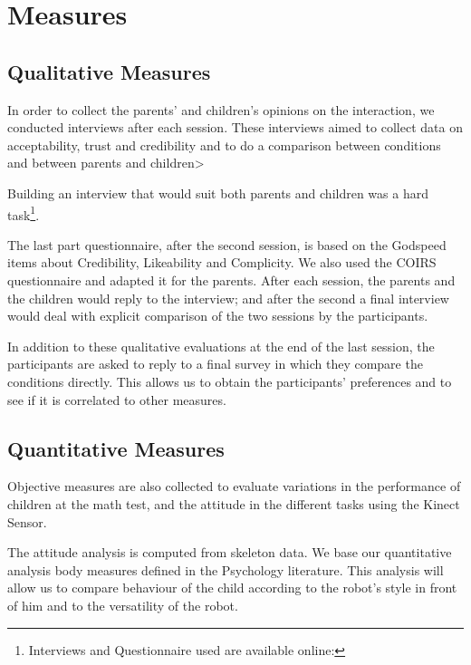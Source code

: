 \section{Measures}
\label{sec:measures}
\subsection{Qualitative Measures}
In order to collect the parents' and children's opinions on the interaction, we conducted interviews after each session.
These interviews aimed to collect data on acceptability, trust and credibility and to do a comparison between conditions and between parents and children>

Building an interview that would suit both parents and children was a hard task\footnote{Interviews and Questionnaire used are available online: }.%






The last part questionnaire, after the second session, is based on the Godspeed\cite{Bartneck2008b} items about Credibility, Likeability and Complicity.
We also used the COIRS~\cite{Robert2014} questionnaire and adapted it for the parents.
After each session, the parents and the children would reply to the interview; and after the second a final interview would deal with explicit comparison of the two sessions by the participants.


In addition to these qualitative evaluations at the end of the last session, the participants are asked to reply to a final survey in which they compare the conditions directly.
This allows us to obtain the participants' preferences and to see if it is correlated to other measures.

\subsection{Quantitative Measures}
Objective measures are also collected to evaluate variations in the performance of children at the math test, and the attitude in the different tasks using the Kinect Sensor.

The attitude analysis is computed from skeleton data.
We base our quantitative analysis body measures defined in the Psychology literature.
This analysis will allow us to compare behaviour of the child according to the robot's style in front of him and to the versatility of the robot.

